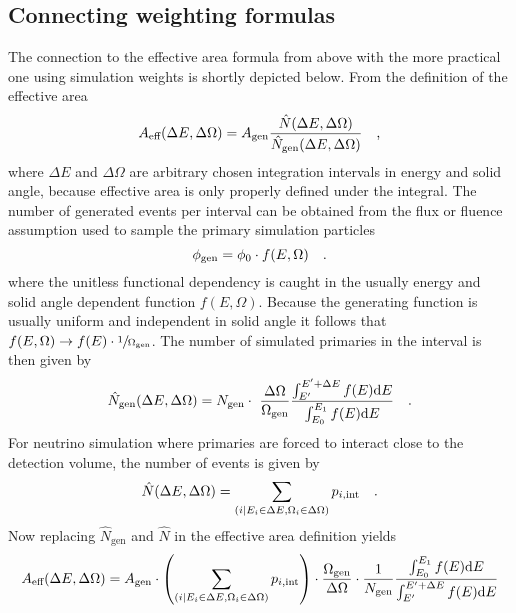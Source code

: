 \subsection*{Connecting weighting formulas}
The connection to the effective area formula from above with the more practical one using simulation weights is shortly depicted below.
From the definition of the effective area
\begin{equation}
  A_\text{eff}(\Delta E, \Delta \Omega) =
    A_\text{gen} \frac{\hat{N}(\Delta E, \Delta \Omega)}
                      {\hat{N}_\text{gen}(\Delta E, \Delta \Omega)}
  \quad\text{,}
\end{equation}
where $\Delta E$ and $\Delta \Omega$ are arbitrary chosen integration intervals in energy and solid angle, because effective area is only properly defined under the integral.
The number of generated events per interval can be obtained from the flux or fluence assumption used to sample the primary simulation particles
\begin{equation}
  \phi_\text{gen} = \phi_0 \cdot f(E, \Omega)
  \quad\text{.}
\end{equation}
where the unitless functional dependency is caught in the usually energy and solid angle dependent function $f(E, \Omega)$.
Because the generating function is usually uniform and independent in solid angle it follows that $f(E, \Omega) \rightarrow f(E)\cdot \sfrac{1}{\Omega_\text{gen}}$.
The number of simulated primaries in the interval is then given by
\begin{equation}
  \hat{N}_\text{gen}(\Delta E, \Delta\Omega) =
    N_\text{gen} \cdot \frac{\Delta\Omega}{\Omega_\text{gen}}
    \frac{\int_{E'}^{E'+\Delta E} f(E) \d{E}}
         {\int_{E_0}^{E_1} f(E) \d{E}}
  \mperiod
\end{equation}
For neutrino simulation where primaries are forced to interact close to the detection volume, the number of events is given by
\begin{equation}
  \hat{N}(\Delta E, \Delta \Omega) =
  \sum_{(i|E_i\in\Delta E, \Omega_i\in\Delta\Omega)} p_{i,\text{int}}
  \quad\text{.}
\end{equation}
Now replacing $\hat{N}_\text{gen}$ and $\hat{N}$ in the effective area definition yields
\begin{equation}
  A_\text{eff}(\Delta E, \Delta \Omega) =
    A_\text{gen} \cdot
    \left(\sum_{(i|E_i\in\Delta E, \Omega_i\in\Delta\Omega)}
          p_{i,\text{int}}\right) \cdot
    \frac{\Omega_\text{gen}}{\Delta\Omega} \cdot \frac{1}{N_\text{gen}}
    \frac{\int_{E_0}^{E_1} f(E) \mathrm{d}E}
         {\int_{E'}^{E'+\Delta E} f(E) \mathrm{d}E}
\end{equation}
